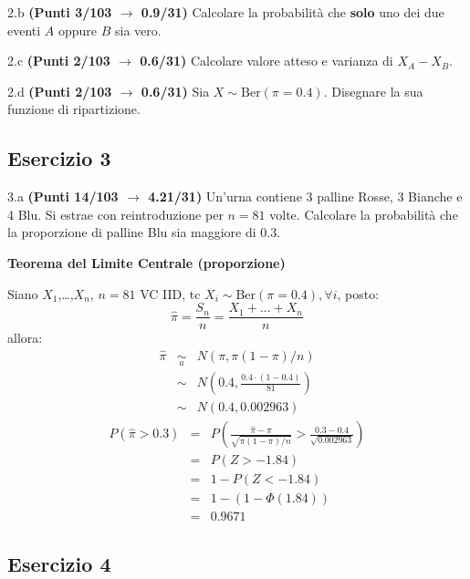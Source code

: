 \documentclass[
  11pt,
]{book}
\theoremstyle{mytheoremstyle}
\theoremstyle{mydefstyle}
\newenvironment{sol}
  {
  \begin{tcolorbox}[enhanced,breakable,arc=0.1mm,boxrule=1pt,colback=white,colframe=iblue,
  title=\bf \fontfamily{lmss}\selectfont \hspace{.5 cm} Soluzione,drop fuzzy shadow]

}{
\end{tcolorbox}
  }
\begin{document}
2.b \textbf{(Punti 3/103 \(\rightarrow\) 0.9/31)} Calcolare la probabilità che \textbf{solo} uno dei due eventi \(A\) oppure \(B\) sia vero.

2.c \textbf{(Punti 2/103 \(\rightarrow\) 0.6/31)} Calcolare valore atteso e varianza di \(X_A-X_B\).

2.d \textbf{(Punti 2/103 \(\rightarrow\) 0.6/31)} Sia \(X\sim\text{Ber}(\pi=0.4)\). Disegnare la sua funzione di ripartizione.

\subsection{Esercizio 3}\label{esercizio-3-24}

3.a \textbf{(Punti 14/103 \(\rightarrow\) 4.21/31)} Un'urna contiene 3 palline Rosse, 3 Bianche e 4 Blu. Si estrae con reintroduzione per \(n=81\) volte.
Calcolare la probabilità che la proporzione di palline Blu sia maggiore di 0.3.

\begin{sol}
\textbf{Teorema del Limite Centrale (proporzione)}

Siano \(X_1\),\ldots,\(X_n\), \(n=81\) VC IID, tc \(X_i\sim\text{Ber}(\pi=0.4)\)\(,\forall i\), posto:
\[
      \hat\pi=\frac{S_n}n = \frac{X_1 + ... + X_n}n
      \]
allora:\begin{eqnarray*}
  \hat\pi & \mathop{\sim}\limits_{a}& N(\pi,\pi(1-\pi)/n) \\
  &\sim & N\left(0.4,\frac{0.4\cdot(1-0.4)}{81}\right) \\
     &\sim & N(0.4,0.002963) 
  \end{eqnarray*}\begin{eqnarray*}
      P( \hat\pi   >   0.3 ) 
        &=& P\left(  \frac { \hat\pi  -  \pi }{ \sqrt{\pi(1-\pi)/n} }  >  \frac { 0.3  -  0.4 }{\sqrt{ 0.002963 }} \right)  \\
                 &=& P\left(  Z   >   -1.84 \right) \\    &=& 1-P(Z< -1.84 )\\ 
                 &=&  1-(1-\Phi( 1.84 )) \\ &=&  0.9671 
      \end{eqnarray*}

\end{sol}

\subsection{Esercizio 4}\label{esercizio-4-24}
\end{document}
